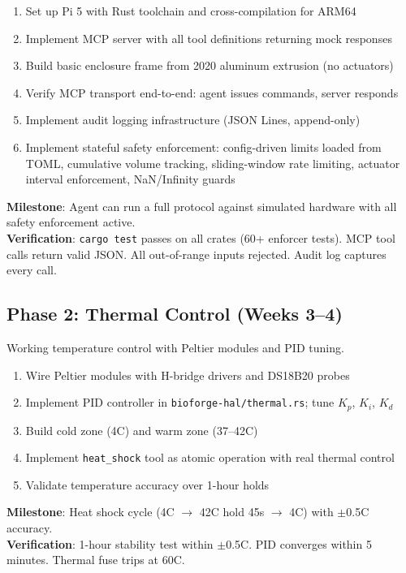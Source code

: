 \documentclass[11pt,letterpaper]{article}
\begin{document}
\begin{enumerate}
  \item Set up Pi 5 with Rust toolchain and cross-compilation for ARM64
  \item Implement MCP server with all tool definitions returning mock responses
  \item Build basic enclosure frame from 2020 aluminum extrusion (no actuators)
  \item Verify MCP transport end-to-end: agent issues commands, server responds
  \item Implement audit logging infrastructure (JSON Lines, append-only)
  \item Implement stateful safety enforcement: config-driven limits loaded from TOML, cumulative volume tracking, sliding-window rate limiting, actuator interval enforcement, NaN/Infinity guards
\end{enumerate}

\textbf{Milestone}: Agent can run a full protocol against simulated hardware with all safety enforcement active.\\
\textbf{Verification}: \texttt{cargo test} passes on all crates (60+ enforcer tests). MCP tool calls return valid JSON. All out-of-range inputs rejected. Audit log captures every call.

\subsection{Phase 2: Thermal Control (Weeks 3--4)}
Working temperature control with Peltier modules and PID tuning.

\begin{enumerate}
  \item Wire Peltier modules with H-bridge drivers and DS18B20 probes
  \item Implement PID controller in \texttt{bioforge-hal/thermal.rs}; tune $K_p$, $K_i$, $K_d$
  \item Build cold zone (4\textdegree{}C) and warm zone (37--42\textdegree{}C)
  \item Implement \texttt{heat\_shock} tool as atomic operation with real thermal control
  \item Validate temperature accuracy over 1-hour holds
\end{enumerate}

\textbf{Milestone}: Heat shock cycle (4\textdegree{}C $\rightarrow$ 42\textdegree{}C hold 45s $\rightarrow$ 4\textdegree{}C) with $\pm$0.5\textdegree{}C accuracy.\\
\textbf{Verification}: 1-hour stability test within $\pm$0.5\textdegree{}C. PID converges within 5 minutes. Thermal fuse trips at 60\textdegree{}C.
\end{document}
